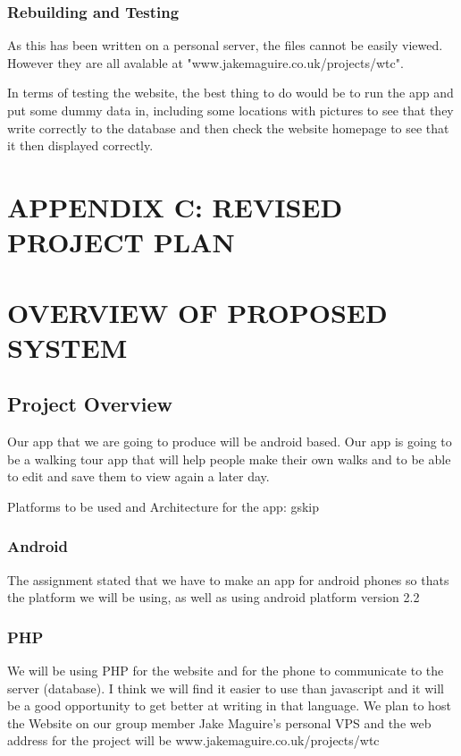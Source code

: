 \documentclass{project}
\begin{document}
\subsubsection{Rebuilding and Testing}
As this has been written on a personal server, the files cannot be easily viewed. However they are all avalable at "www.jakemaguire.co.uk/projects/wtc".

In terms of testing the website, the best thing to do would be to run the app and put some dummy data in, including some locations with pictures to see that they write correctly to the database and then check the website homepage to see that it then displayed correctly.

\newpage

\section{APPENDIX C: REVISED PROJECT PLAN}

\section{OVERVIEW OF PROPOSED SYSTEM}

\subsection{Project Overview}
Our app that we are going to produce will be android based.
Our app is going to be a walking tour app that will help people make their own 
walks and to be able to edit and save them to view again a later day.

Platforms to be used and Architecture for the app:
gskip

\subsubsection{Android}
The assignment stated that we have to make an app for android 
phones so thats the platform we will be using, as well as using android platform version 2.2

\subsubsection{PHP}
We will be using PHP for the website and for the phone to communicate 
to the server (database). I think we will find it easier to use than 
javascript and it will be a good opportunity to get better at writing 
in that language. We plan to host the Website on our group member Jake Maguire's personal VPS and the web address for the project will be www.jakemaguire.co.uk/projects/wtc
\end{document}

